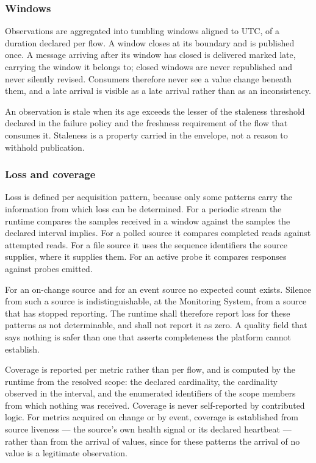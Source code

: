 \hypertarget{windows}{%
\subsubsection{Windows}\label{windows}}

Observations are aggregated into tumbling windows aligned to UTC, of a
duration declared per flow. A window closes at its boundary and is
published once. A message arriving after its window has closed is
delivered marked late, carrying the window it belongs to; closed windows
are never republished and never silently revised. Consumers therefore
never see a value change beneath them, and a late arrival is visible as
a late arrival rather than as an inconsistency.

An observation is stale when its age exceeds the lesser of the staleness
threshold declared in the failure policy and the freshness requirement
of the flow that consumes it. Staleness is a property carried in the
envelope, not a reason to withhold publication.

\hypertarget{loss-and-coverage}{%
\subsubsection{Loss and coverage}\label{loss-and-coverage}}

Loss is defined per acquisition pattern, because only some patterns
carry the information from which loss can be determined. For a periodic
stream the runtime compares the samples received in a window against the
samples the declared interval implies. For a polled source it compares
completed reads against attempted reads. For a file source it uses the
sequence identifiers the source supplies, where it supplies them. For an
active probe it compares responses against probes emitted.

For an on-change source and for an event source no expected count
exists. Silence from such a source is indistinguishable, at the
Monitoring System, from a source that has stopped reporting. The runtime
shall therefore report loss for these patterns as not determinable, and
shall not report it as zero. A quality field that says nothing is safer
than one that asserts completeness the platform cannot establish.

Coverage is reported per metric rather than per flow, and is computed by
the runtime from the resolved scope: the declared cardinality, the
cardinality observed in the interval, and the enumerated identifiers of
the scope members from which nothing was received. Coverage is never
self-reported by contributed logic. For metrics acquired on change or by
event, coverage is established from source liveness --- the source's own
health signal or its declared heartbeat --- rather than from the arrival
of values, since for these patterns the arrival of no value is a
legitimate observation.

